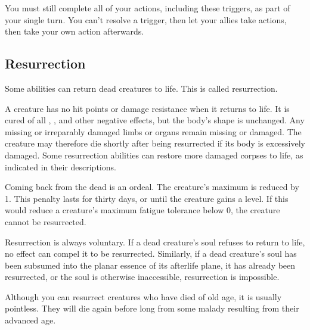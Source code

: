     You must still complete all of your actions, including these triggers, as part of your single turn.
    You can't resolve a trigger, then let your allies take actions, then take your own action afterwards.

  \subsection{Resurrection}\label{Resurrection}
    Some abilities can return dead creatures to life.
    This is called resurrection.

    A creature has no hit points or damage resistance when it returns to life.
    It is cured of all , , and other negative effects, but the body's shape is unchanged.
    Any missing or irreparably damaged limbs or organs remain missing or damaged.
    The creature may therefore die shortly after being resurrected if its body is excessively damaged.
    Some resurrection abilities can restore more damaged corpses to life, as indicated in their descriptions.

    Coming back from the dead is an ordeal.
    The creature's maximum  is reduced by 1.
    This penalty lasts for thirty days, or until the creature gains a level.
    If this would reduce a creature's maximum fatigue tolerance below 0, the creature cannot be resurrected.

    Resurrection is always voluntary.
    If a dead creature's soul refuses to return to life, no effect can compel it to be resurrected.
    Similarly, if a dead creature's soul has been subsumed into the planar essence of its afterlife plane, it has already been resurrected, or the soul is otherwise inaccessible, resurrection is impossible.

    Although you can resurrect creatures who have died of old age, it is usually pointless.
    They will die again before long from some malady resulting from their advanced age.

